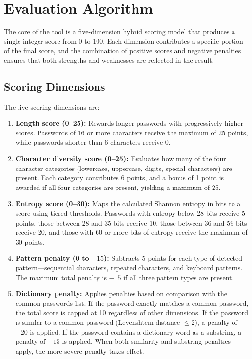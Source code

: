 \section{Evaluation Algorithm}

The core of the tool is a five-dimension hybrid scoring model that produces a single integer score from 0 to 100. Each dimension contributes a specific portion of the final score, and the combination of positive scores and negative penalties ensures that both strengths and weaknesses are reflected in the result.

\subsection{Scoring Dimensions}

The five scoring dimensions are:

\begin{enumerate}
    \item \textbf{Length score (0--25):} Rewards longer passwords with progressively higher scores. Passwords of 16 or more characters receive the maximum of 25 points, while passwords shorter than 6 characters receive 0.

    \item \textbf{Character diversity score (0--25):} Evaluates how many of the four character categories (lowercase, uppercase, digits, special characters) are present. Each category contributes 6 points, and a bonus of 1 point is awarded if all four categories are present, yielding a maximum of 25.

    \item \textbf{Entropy score (0--30):} Maps the calculated Shannon entropy in bits to a score using tiered thresholds. Passwords with entropy below 28 bits receive 5 points, those between 28 and 35 bits receive 10, those between 36 and 59 bits receive 20, and those with 60 or more bits of entropy receive the maximum of 30 points.

    \item \textbf{Pattern penalty (0 to $-15$):} Subtracts 5 points for each type of detected pattern---sequential characters, repeated characters, and keyboard patterns. The maximum total penalty is $-15$ if all three pattern types are present.

    \item \textbf{Dictionary penalty:} Applies penalties based on comparison with the common-passwords list. If the password exactly matches a common password, the total score is capped at 10 regardless of other dimensions. If the password is similar to a common password (Levenshtein distance $\leq 2$), a penalty of $-20$ is applied. If the password contains a dictionary word as a substring, a penalty of $-15$ is applied. When both similarity and substring penalties apply, the more severe penalty takes effect.
\end{enumerate}

